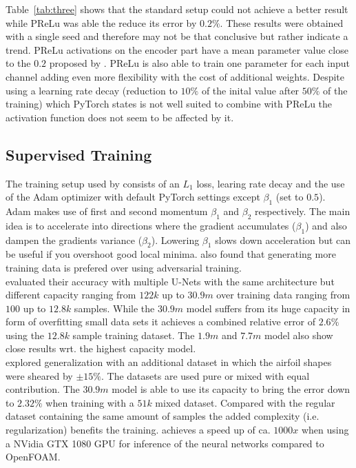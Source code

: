\documentclass[acmtog]{techreportacmart}
\begin{document}
Table~\ref{tab:three} shows that the standard setup could not achieve a better result while PReLu was able the reduce its error by $0.2\%$. These results were obtained with a single seed and therefore may not be that conclusive but rather indicate a trend. PReLu activations on the encoder part have a mean parameter value close to the $0.2$ proposed by \cite{Thuerey20}. PReLu is also able to train one parameter for each input channel adding even more flexibility with the cost of additional weights. Despite \cite{Thuerey20} using a learning rate decay (reduction to $10\%$ of the inital value after $50\%$ of the training) which PyTorch states is not well suited to combine with PReLu the activation function does not seem to be affected by it.

\subsection{Supervised Training}
The training setup used by \cite{Thuerey20} consists of an $L_1$ loss, learing rate decay and the use of the Adam optimizer \cite{kingma2014adam} with default PyTorch settings except $\beta_1$ (set to $0.5$). Adam makes use of first and second momentum $\beta_1$ and $\beta_2$ respectively. The main idea is to accelerate into directions where the gradient accumulates ($\beta_1$) and also dampen the gradients variance ($\beta_2$). Lowering  $\beta_1$ slows down acceleration but can be useful if you overshoot good local minima. \cite{Thuerey20} also found that generating more training data is prefered over using adversarial training.\\
\cite{Thuerey20} evaluated their accuracy with multiple U-Nets with the same architecture but different capacity ranging from $122k$ up to $30.9m$ over training data ranging from $100$ up to $12.8k$ samples. While the $30.9m$ model suffers from its huge capacity in form of overfitting small data sets it achieves a combined relative error of $2.6\%$ using the $12.8k$ sample training dataset. The $1.9m$ and $7.7m$ model also show close results wrt. the highest capacity model.\\
\cite{Thuerey20} explored generalization with an additional dataset in which the airfoil shapes were sheared by $\pm15\%$. The datasets are used pure or mixed with equal contribution.
The $30.9m$ model is able to use its capacity to bring the error down to $2.32\%$ when training with a $51k$ mixed dataset. Compared with the regular dataset containing the same amount of samples the added complexity (i.e. regularization) benefits the training.
\cite{Thuerey20} achieves a speed up of ca. $1000x$ when using a NVidia GTX 1080 GPU for inference of the neural networks compared to OpenFOAM.
\end{document}
